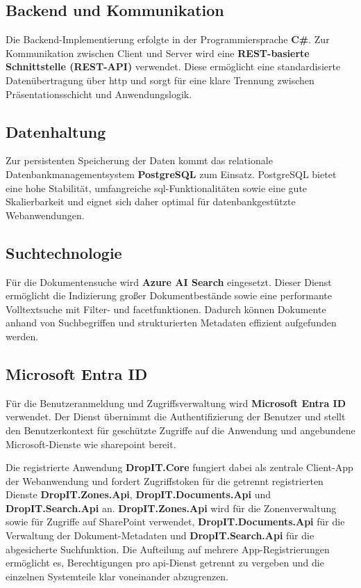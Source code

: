 \subsection*{Backend und Kommunikation}
Die Backend-Implementierung erfolgte in der Programmiersprache \textbf{C\#}. Zur Kommunikation zwischen Client und Server wird eine \textbf{REST-basierte Schnittstelle (REST-API)} verwendet. Diese ermöglicht eine standardisierte Datenübertragung über \acrshort{http} und sorgt für eine klare Trennung zwischen Präsentationsschicht und Anwendungslogik.

\subsection*{Datenhaltung}
Zur persistenten Speicherung der Daten kommt das relationale Datenbankmanagementsystem \textbf{PostgreSQL} zum Einsatz. PostgreSQL bietet eine hohe Stabilität, umfangreiche \acrshort{sql}-Funktionalitäten sowie eine gute Skalierbarkeit und eignet sich daher optimal für datenbankgestützte Webanwendungen.

\subsection*{Suchtechnologie}
Für die Dokumentensuche wird \textbf{Azure AI Search} eingesetzt. Dieser Dienst ermöglicht die Indizierung großer Dokumentbestände sowie eine performante Volltextsuche mit Filter- und \gls{facet}funktionen. Dadurch können Dokumente anhand von Suchbegriffen und strukturierten Metadaten effizient aufgefunden werden.

\subsection*{Microsoft Entra ID}
Für die Benutzeranmeldung und Zugriffsverwaltung wird \textbf{Microsoft Entra ID} verwendet. Der Dienst übernimmt die Authentifizierung der Benutzer und stellt den Benutzerkontext für geschützte Zugriffe auf die Anwendung und angebundene Microsoft-Dienste wie \gls{sharepoint} bereit.

Die registrierte Anwendung \textbf{DropIT.Core} fungiert dabei als zentrale Client-App der Webanwendung und fordert Zugriffstoken für die getrennt registrierten Dienste \textbf{DropIT.Zones.Api}, \textbf{DropIT.Documents.Api} und \textbf{DropIT.Search.Api} an. \textbf{DropIT.Zones.Api} wird für die Zonenverwaltung sowie für Zugriffe auf SharePoint verwendet, \textbf{DropIT.Documents.Api} für die Verwaltung der Dokument-Metadaten und \textbf{DropIT.Search.Api} für die abgesicherte Suchfunktion. Die Aufteilung auf mehrere App-Registrierungen ermöglicht es, Berechtigungen pro \acrshort{api}-Dienst getrennt zu vergeben und die einzelnen Systemteile klar voneinander abzugrenzen.

